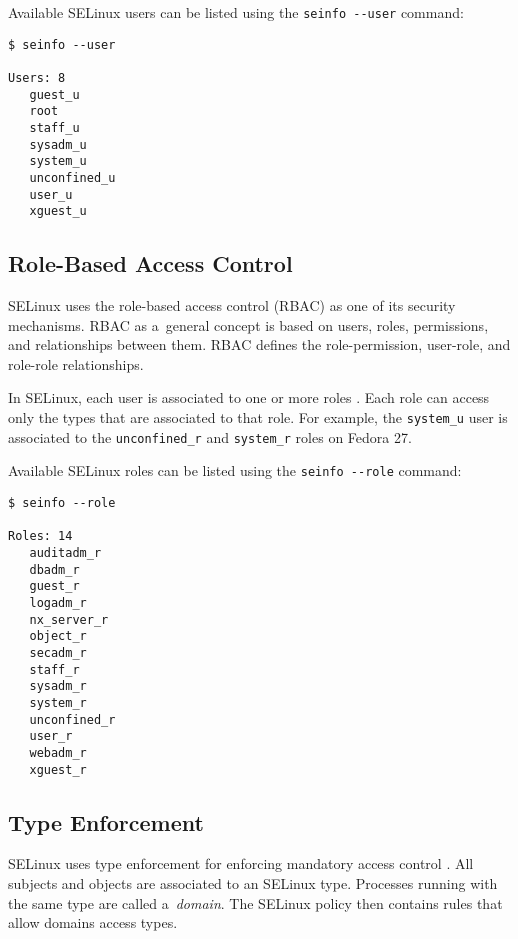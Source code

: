 \pagebreak

Available SELinux users can be listed using the \texttt{seinfo -{}-user}
command:
\begin{lstlisting}
$ seinfo --user

Users: 8
   guest_u
   root
   staff_u
   sysadm_u
   system_u
   unconfined_u
   user_u
   xguest_u
\end{lstlisting}

\subsection{Role-Based Access Control}
\label{rbac}
SELinux uses the role-based access control (RBAC) as one of its security
mechanisms. RBAC as a~general concept is based on users, roles, permissions,
and relationships between them. RBAC defines the role-permission, user-role, and
role-role relationships.

In SELinux, each user is associated to one or more roles \cite[p.~24]{tsn}.
Each role can access only the types that are associated to that role. For
example, the \texttt{system\_u} user is associated to the
\texttt{unconfined\_r} and \texttt{system\_r} roles on Fedora 27.

Available SELinux roles can be listed using the \texttt{seinfo -{}-role}
command:
\begin{lstlisting}
$ seinfo --role

Roles: 14
   auditadm_r
   dbadm_r
   guest_r
   logadm_r
   nx_server_r
   object_r
   secadm_r
   staff_r
   sysadm_r
   system_r
   unconfined_r
   user_r
   webadm_r
   xguest_r
\end{lstlisting}

\subsection{Type Enforcement}
\label{te}
SELinux uses type enforcement for enforcing mandatory access control
\cite[pp.~25--26]{tsn}. All subjects and objects are associated to an SELinux
type. Processes running with the same type are called a~\emph{domain}. The
SELinux policy then contains rules that allow domains access types.

